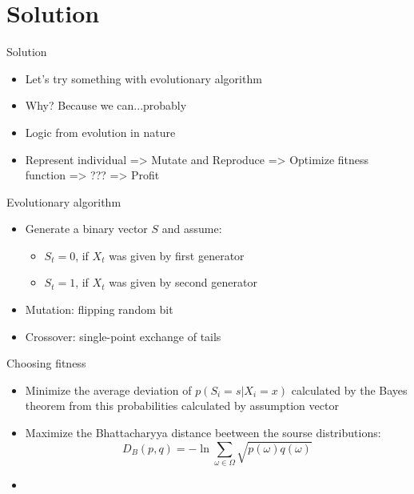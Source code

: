 \documentclass[hyperref=unicode,graphics=pdflatex,13pt]{beamer}
\begin{document}
\section{Solution} %
\begin{frame}{Solution}
  \begin{itemize}
   \item Let's try something with evolutionary algorithm
   \item Why? Because we can...probably
   \item Logic from evolution in nature
   \item Represent individual => Mutate and Reproduce => Optimize fitness function => ??? => Profit
  \end{itemize}

\end{frame}

\begin{frame}{Evolutionary algorithm}
 \begin{itemize}
  \item Generate a binary vector $S$ and assume:
   \begin{itemize}
   \item $S_t = 0$, if $X_t$ was given by first generator
   \item $S_t = 1$, if $X_t$ was given by second generator
   \end{itemize}
  \item Mutation: flipping random bit
  \item Crossover: single-point exchange of tails
 \end{itemize}
\end{frame}

\begin{frame}{Choosing fitness}
\begin{itemize}
   \item Minimize the average deviation of $p(S_i=s | X_i = x)$ calculated by the Bayes theorem from this probabilities calculated by assumption vector
   \item Maximize the Bhattacharyya distance beetween the sourse distributions:
   $$D_B(p, q) = -\ln{\sum_{\omega \in \Omega} \sqrt{p(\omega)q(\omega)}}$$
   \item %
\end{itemize}

\end{frame}
\end{document}
